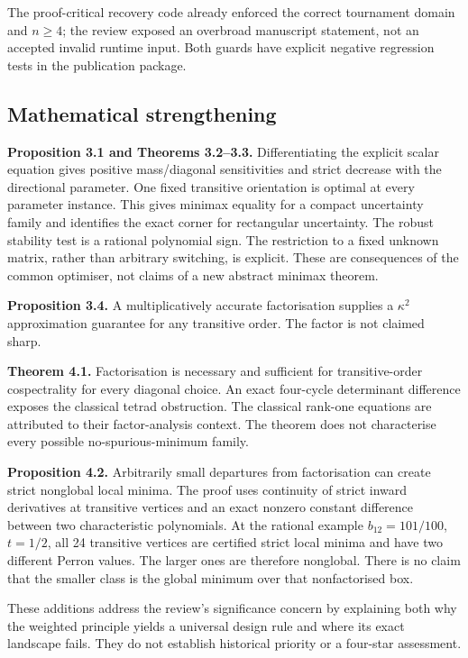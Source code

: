 \documentclass[
  11pt,
  a4paper,
]{article}
\begin{document}
The proof-critical recovery code already enforced the correct tournament
domain and \(n\ge4\); the review exposed an overbroad manuscript
statement, not an accepted invalid runtime input. Both guards have
explicit negative regression tests in the publication package.

\subsection{Mathematical
strengthening}\label{mathematical-strengthening}

\textbf{Proposition 3.1 and Theorems 3.2--3.3.} Differentiating the
explicit scalar equation gives positive mass/diagonal sensitivities and
strict decrease with the directional parameter. One fixed transitive
orientation is optimal at every parameter instance. This gives minimax
equality for a compact uncertainty family and identifies the exact
corner for rectangular uncertainty. The robust stability test is a
rational polynomial sign. The restriction to a fixed unknown matrix,
rather than arbitrary switching, is explicit. These are consequences of
the common optimiser, not claims of a new abstract minimax theorem.

\textbf{Proposition 3.4.} A multiplicatively accurate factorisation
supplies a \(\kappa^2\) approximation guarantee for any transitive
order. The factor is not claimed sharp.

\textbf{Theorem 4.1.} Factorisation is necessary and sufficient for
transitive-order cospectrality for every diagonal choice. An exact
four-cycle determinant difference exposes the classical tetrad
obstruction. The classical rank-one equations are attributed to their
factor-analysis context. The theorem does not characterise every
possible no-spurious-minimum family.

\textbf{Proposition 4.2.} Arbitrarily small departures from
factorisation can create strict nonglobal local minima. The proof uses
continuity of strict inward derivatives at transitive vertices and an
exact nonzero constant difference between two characteristic
polynomials. At the rational example \(b_{12}=101/100\), \(t=1/2\), all
24 transitive vertices are certified strict local minima and have two
different Perron values. The larger ones are therefore nonglobal. There
is no claim that the smaller class is the global minimum over that
nonfactorised box.

These additions address the review's significance concern by explaining
both why the weighted principle yields a universal design rule and where
its exact landscape fails. They do not establish historical priority or
a four-star assessment.
\end{document}
